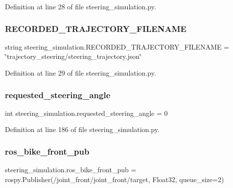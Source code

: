 Definition at line 28 of file steering\+\_\+simulation.\+py.

\mbox{\label{namespacesteering__simulation_ab4de54bdf1b917546004a6eb92a8cd27}} 
\subsubsection{\texorpdfstring{RECORDED\_TRAJECTORY\_FILENAME}{RECORDED\_TRAJECTORY\_FILENAME}}
{\footnotesize\ttfamily string steering\+\_\+simulation.\+R\+E\+C\+O\+R\+D\+E\+D\+\_\+\+T\+R\+A\+J\+E\+C\+T\+O\+R\+Y\+\_\+\+F\+I\+L\+E\+N\+A\+ME = \char`\"{}trajectory\+\_\+steering/steering\+\_\+trajectory.\+json\char`\"{}}



Definition at line 29 of file steering\+\_\+simulation.\+py.

\mbox{\label{namespacesteering__simulation_a1906425964226a8e34fc3f159b4d54fb}} 
\subsubsection{\texorpdfstring{requested\_steering\_angle}{requested\_steering\_angle}}
{\footnotesize\ttfamily int steering\+\_\+simulation.\+requested\+\_\+steering\+\_\+angle = 0}



Definition at line 186 of file steering\+\_\+simulation.\+py.

\mbox{\label{namespacesteering__simulation_a2f98d3e960637df34f895f4ccee97bbe}} 
\subsubsection{\texorpdfstring{ros\_bike\_front\_pub}{ros\_bike\_front\_pub}}
{\footnotesize\ttfamily steering\+\_\+simulation.\+ros\+\_\+bike\+\_\+front\+\_\+pub = rospy.\+Publisher(\textquotesingle{}/joint\+\_\+front/joint\+\_\+front/target\textquotesingle{}, Float32, queue\+\_\+size=2)}



